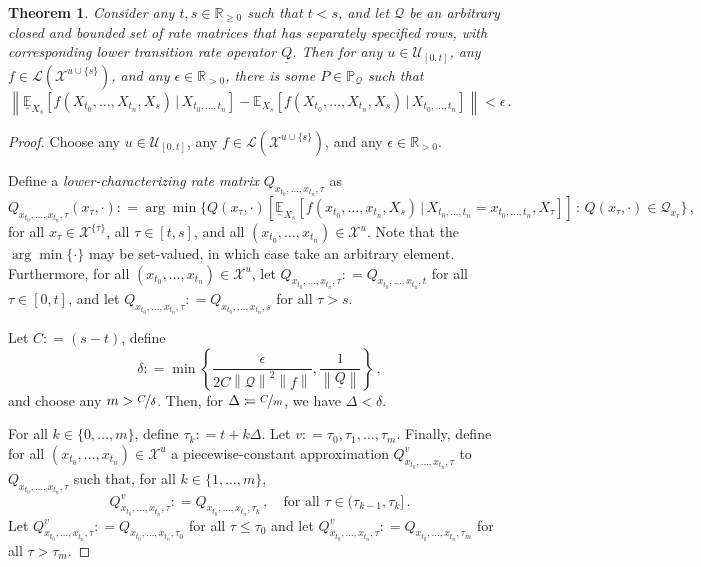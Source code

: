 \documentclass[10pt]{paper}
\newtheorem{theorem}{Theorem}
\newcommand{\reals}{\mathbb{R}}
\newcommand{\realspos}{\reals_{>0}}
\newcommand{\realsnonneg}{\reals_{\geq 0}}
\newcommand{\states}{\mathcal{X}}
\newcommand{\processes}{\mathbb{P}}
\newcommand{\gambles}{\mathcal{L}}
\newcommand{\rateset}{\mathcal{Q}}
\newcommand{\lrate}{\underline{Q}}
\newcommand{\norm}[1]{\left\lVert #1 \right\rVert}
\newcommand{\coloneqq}{:\!=}
\newcommand{\argmin}{\arg\min}
\begin{document}
\begin{theorem}
Consider any $t,s\in\realsnonneg$ such that $t<s$, and let $\rateset$ be an arbitrary closed and bounded set of rate matrices that has separately specified rows, with corresponding lower transition rate operator $\lrate$. Then for any $u\in\mathcal{U}_{[0,t]}$, any $f\in\gambles(\states^{u\cup\{s\}})$, and any $\epsilon\in\realspos$, there is some $P\in\processes_\rateset$ such that
\begin{equation*}
\norm{\underline{\mathbb{E}}_{X_s}[f(X_{t_0},\ldots,X_{t_n},X_s)\,\vert\,X_{t_0,\ldots,t_n}] - \mathbb{E}_{X_s}[f(X_{t_0},\ldots,X_{t_n},X_s)\,\vert\,X_{t_0,\ldots,t_n}]} < \epsilon\,.
\end{equation*}
\end{theorem}
\begin{proof}
Choose any $u\in\mathcal{U}_{[0,t]}$, any $f\in\gambles(\states^{u\cup\{s\}})$, and any $\epsilon\in\realspos$.

Define a \emph{lower-characterizing rate matrix} $Q_{x_{t_0},\ldots,x_{t_n},\tau}$ as
\begin{equation*}
Q_{x_{t_0},\ldots,x_{t_n},\tau}(x_\tau,\cdot) \coloneqq \argmin\bigl\{Q(x_\tau,\cdot)\left[\underline{\mathbb{E}}_{X_s}[f(x_{t_0},\ldots,x_{t_n},X_s)\,\vert\,X_{t_0,\ldots,t_n}=x_{t_0,\ldots,t_n},X_{\tau}]\right]\,:\,Q(x_\tau,\cdot)\in\rateset_{x_\tau}\bigr\}\,,
\end{equation*}
for all $x_\tau\in\states^{\{\tau\}}$, all $\tau\in[t,s]$, and all $(x_{t_0},\ldots,x_{t_n})\in\states^u$. Note that the $\argmin\{\cdot\}$ may be set-valued, in which case take an arbitrary element. Furthermore, for all $(x_{t_0},\ldots,x_{t_n})\in\states^u$, let $Q_{x_{t_0},\ldots,x_{t_n},\tau}\coloneqq Q_{x_{t_0},\ldots,x_{t_n},t}$ for all $\tau\in[0,t]$, and let $Q_{x_{t_0},\ldots,x_{t_n},\tau}\coloneqq Q_{x_{t_0},\ldots,x_{t_n},s}$ for all $\tau>s$.

Let $C\coloneqq (s-t)$, define
\begin{equation*}
\delta\coloneqq \min\left\{\frac{\epsilon}{2C\norm{\rateset}^2\norm{f}}, \frac{1}{\norm{\lrate}}\right\}\,,
\end{equation*}
and choose any $m>\nicefrac{C}{\delta}$. Then, for $\Delta\coloneqq\nicefrac{C}{m}$, we have $\Delta<\delta$.

For all $k\in\{0,\ldots,m\}$, define $\tau_k\coloneqq t+k\Delta$. Let $v\coloneqq \tau_0,\tau_1,\ldots,\tau_m$. Finally, define for all $(x_{t_0},\ldots,x_{t_n})\in\states^u$ a piecewise-constant approximation $Q_{x_{t_0},\ldots,x_{t_n},\tau}^v$ to $Q_{x_{t_0},\ldots,x_{t_n},\tau}$ such that, for all $k\in\{1,\ldots,m\}$,
\begin{equation*}
Q_{x_{t_0},\ldots,x_{t_n},\tau}^v\coloneqq Q_{x_{t_0},\ldots,x_{t_n},\tau_k}\,,\quad\text{for all $\tau\in(\tau_{k-1},\tau_k]$}\,.
\end{equation*}
Let $Q_{x_{t_0},\ldots,x_{t_n},\tau}^v\coloneqq Q_{x_{t_0},\ldots,x_{t_n},\tau_0}$ for all $\tau\leq\tau_0$ and let $Q_{x_{t_0},\ldots,x_{t_n},\tau}^v\coloneqq Q_{x_{t_0},\ldots,x_{t_n},\tau_m}$ for all $\tau>\tau_m$.


\end{proof}
\end{document}
